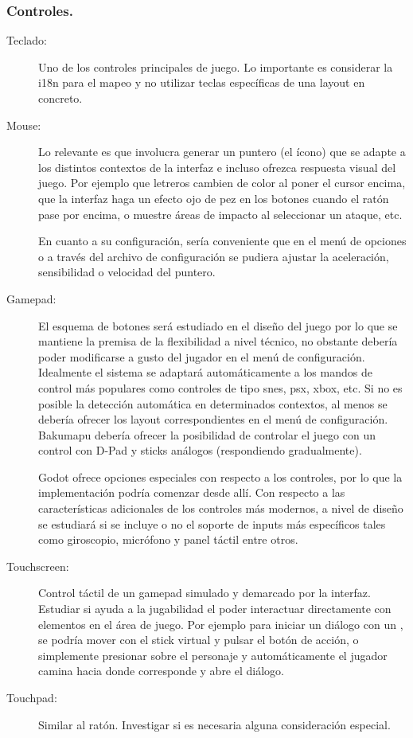 \subsubsection{Controles.}
\begin{description}
\item[Teclado:] Uno de los controles principales de juego. Lo importante es considerar la i18n para el mapeo y no utilizar teclas específicas de una layout en concreto.

\item[Mouse:] Lo relevante es que involucra generar un puntero (el ícono) que se adapte a los distintos contextos de la interfaz e incluso ofrezca respuesta visual del juego. Por ejemplo que letreros cambien de color al poner el cursor encima, que la interfaz haga un efecto ojo de pez en los botones cuando el ratón pase por encima, o muestre áreas de impacto al seleccionar un ataque, etc.

En cuanto a su configuración, sería conveniente que en el menú de opciones o a través del archivo de configuración se pudiera ajustar la aceleración, sensibilidad o velocidad del puntero. 

\item[Gamepad:] El esquema de botones será estudiado en el diseño del juego por lo que se mantiene la premisa de la flexibilidad a nivel técnico, no obstante debería poder modificarse a gusto del jugador en el menú de configuración. Idealmente el sistema se adaptará automáticamente a los mandos de control más populares como controles de tipo snes, psx, xbox, etc. Si no es posible la detección automática en determinados contextos, al menos se debería ofrecer los layout correspondientes en el menú de configuración. Bakumapu debería ofrecer la posibilidad de controlar el juego con un control con D-Pad y sticks análogos (respondiendo gradualmente).

Godot ofrece opciones especiales con respecto a los controles, por lo que la implementación podría comenzar desde allí. Con respecto a las características adicionales de los controles más modernos, a nivel de diseño se estudiará si se incluye o no el soporte de inputs más específicos tales como giroscopio, micrófono y panel táctil entre otros.

\item[Touchscreen:] Control táctil de un gamepad simulado y demarcado por la interfaz. Estudiar si ayuda a la jugabilidad el poder interactuar directamente con elementos en el área de juego. Por ejemplo para iniciar un diálogo con un , se podría mover con el stick virtual y pulsar el botón de acción, o simplemente presionar sobre el personaje y automáticamente el jugador camina hacia donde corresponde y abre el diálogo.

\item[Touchpad:] Similar al ratón. Investigar si es necesaria alguna consideración especial.
\end{description}


